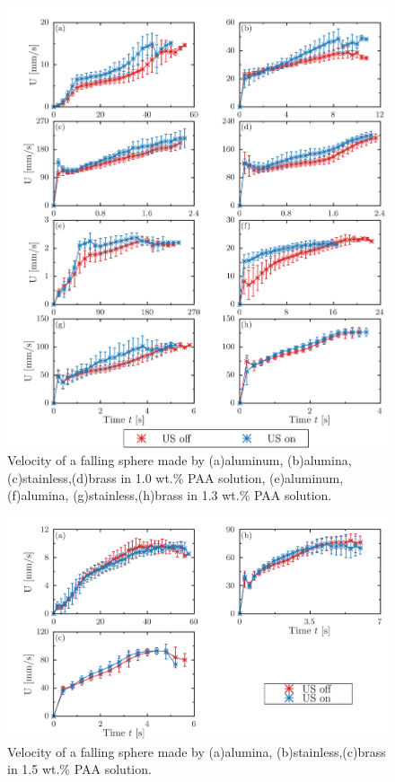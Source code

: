 \begin{figure}[h]
    \centering
    \includegraphics[width=15.0cm,clip]{5-Results/result_data/1.0-1.3.png}
    \caption{Velocity of a falling sphere made by (a)aluminum, (b)alumina, (c)stainless,(d)brass in 1.0 wt.\% PAA solution, (e)aluminum, (f)alumina, (g)stainless,(h)brass in 1.3 wt.\% PAA solution.}
    \label{fig:1.0-1.3}
\end{figure}

\begin{figure}[h]
    \centering
    \includegraphics[width=15.0cm,clip]{5-Results/result_data/1.5.png}
    \caption{Velocity of a falling sphere made by (a)alumina, (b)stainless,(c)brass in 1.5 wt.\% PAA solution.}
    \label{fig:1.5}
\end{figure}